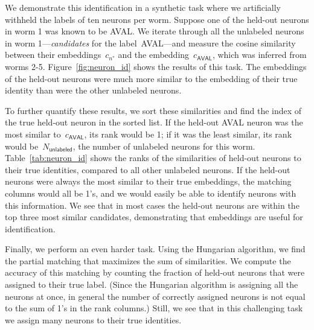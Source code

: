 \documentclass{article}
\begin{document}
We demonstrate this identification in a synthetic task where we
artificially withheld the labels of ten neurons per worm.  Suppose one
of the held-out neurons in worm 1 was known to be \textsf{AVAL}.  We
iterate through all the unlabeled neurons in worm
1---\emph{candidates} for the label~\textsf{AVAL}---and measure the
cosine similarity between their embeddings~$c_{n^*}$ and the
embedding~$c_{\mathsf{AVAL}}$, which was inferred from worms 2-5.
Figure~\ref{fig:neuron_id} shows the results of this task.  The
embeddings of the held-out neurons were much more similar to the
embedding of their true identity than were the other unlabeled
neurons.


To further quantify these results, we sort these similarities
and find the index of the true held-out neuron in the sorted list.
If the held-out AVAL neuron was the most similar to~$c_{\mathsf{AVAL}}$,
its rank would be 1; if it was the least similar, its rank would
be~$N_{\mathsf{unlabeled}}$, the number of unlabeled neurons for
this worm.  Table~\ref{tab:neuron_id} shows the ranks of the
similarities of held-out neurons to their true identities, compared
to all other unlabeled neurons.  If the held-out
neurons were always the most similar to their true embeddings, the
matching columns would all be 1's, and we would easily be able to
identify neurons with this information.  We see that in most cases
the held-out neurons are within the top three most similar candidates,
demonstrating that embeddings are useful for identification. 


Finally, we perform an even harder task. Using the Hungarian algorithm,
we find the partial matching that maximizes the sum of similarities.
We compute the accuracy of this matching by counting the fraction of held-out
neurons that were assigned to their true label. (Since the Hungarian
algorithm is assigning all the neurons at once, in general the number
of correctly assigned neurons is not equal to the sum of 1's in the
rank columns.) Still, we see that in this challenging task we assign
many neurons to their true identities.
\end{document}
